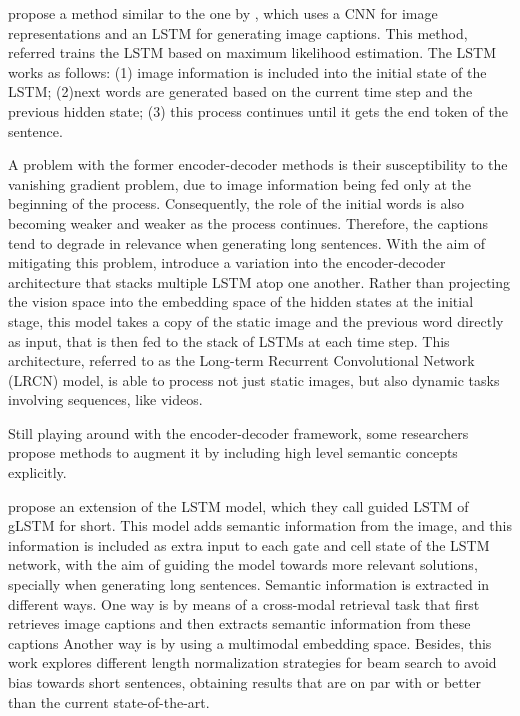 \citet{Vinyals2015} propose a method similar to the one by \citet{Kiros2014a}, which uses a CNN for image representations and an LSTM for generating image captions. This method, referred trains the LSTM based on maximum likelihood estimation. The LSTM works as follows: (1) image information is included into the initial state of the LSTM; (2)next words are generated based on the current time step and the previous hidden state; (3) this process continues until it gets the end token of the sentence. 

A problem with the former encoder-decoder methods is their susceptibility to the vanishing gradient problem, due to  image information being fed only at the beginning of the process. Consequently, the role of the initial words is also becoming weaker and weaker as the process continues. Therefore, the captions tend to degrade in relevance when generating long sentences. With the aim of mitigating this problem, \citet{Donahue2015} introduce a variation into the encoder-decoder architecture that stacks multiple LSTM atop one another. Rather than projecting the vision space into the embedding space of the hidden states at the initial stage, this model takes a copy of the static image and the previous word directly as input, that is then fed to the stack of LSTMs at each time step. This architecture, referred to as the Long-term Recurrent Convolutional Network (LRCN) model, is able to process not just static images, but also dynamic tasks involving sequences, like videos.

Still playing around with the encoder-decoder framework, some researchers propose methods to augment it by including high level semantic concepts explicitly. 

\citet{Jia2015} propose an extension of the LSTM model, which they call guided LSTM of gLSTM for short. This model adds semantic information from the image, and this information is included as extra input to each gate and cell state of the LSTM network, with the aim of guiding the model towards more relevant solutions, specially when generating long sentences. Semantic information is extracted in different ways. One way is by means of a cross-modal retrieval task that first retrieves image captions and then extracts semantic information from these captions Another way is by using a multimodal embedding space. Besides, this work explores different length normalization strategies for beam search to avoid bias towards short sentences, obtaining results that are on par with or better than the current state-of-the-art.

